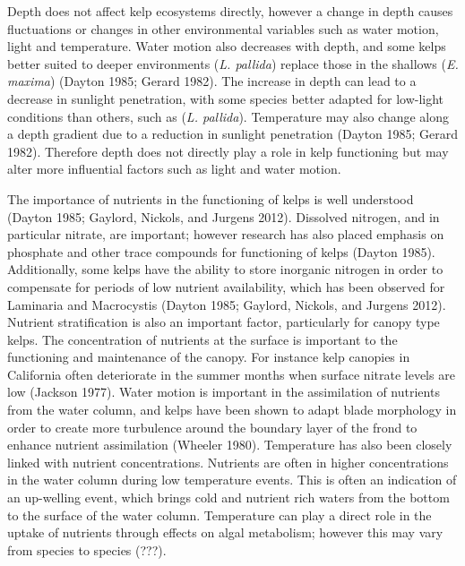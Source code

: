 \documentclass[
]{article}
\begin{document}
Depth does not affect kelp ecosystems directly, however a change in
depth causes fluctuations or changes in other environmental variables
such as water motion, light and temperature. Water motion also decreases
with depth, and some kelps better suited to deeper environments
(\emph{L. pallida}) replace those in the shallows (\emph{E. maxima})
(Dayton 1985; Gerard 1982). The increase in depth can lead to a decrease
in sunlight penetration, with some species better adapted for low-light
conditions than others, such as (\emph{L. pallida}). Temperature may
also change along a depth gradient due to a reduction in sunlight
penetration (Dayton 1985; Gerard 1982). Therefore depth does not
directly play a role in kelp functioning but may alter more influential
factors such as light and water motion.

The importance of nutrients in the functioning of kelps is well
understood (Dayton 1985; Gaylord, Nickols, and Jurgens 2012). Dissolved
nitrogen, and in particular nitrate, are important; however research has
also placed emphasis on phosphate and other trace compounds for
functioning of kelps (Dayton 1985). Additionally, some kelps have the
ability to store inorganic nitrogen in order to compensate for periods
of low nutrient availability, which has been observed for Laminaria and
Macrocystis (Dayton 1985; Gaylord, Nickols, and Jurgens 2012). Nutrient
stratification is also an important factor, particularly for canopy type
kelps. The concentration of nutrients at the surface is important to the
functioning and maintenance of the canopy. For instance kelp canopies in
California often deteriorate in the summer months when surface nitrate
levels are low (Jackson 1977). Water motion is important in the
assimilation of nutrients from the water column, and kelps have been
shown to adapt blade morphology in order to create more turbulence
around the boundary layer of the frond to enhance nutrient assimilation
(Wheeler 1980). Temperature has also been closely linked with nutrient
concentrations. Nutrients are often in higher concentrations in the
water column during low temperature events. This is often an indication
of an up-welling event, which brings cold and nutrient rich waters from
the bottom to the surface of the water column. Temperature can play a
direct role in the uptake of nutrients through effects on algal
metabolism; however this may vary from species to species (???).
\end{document}
